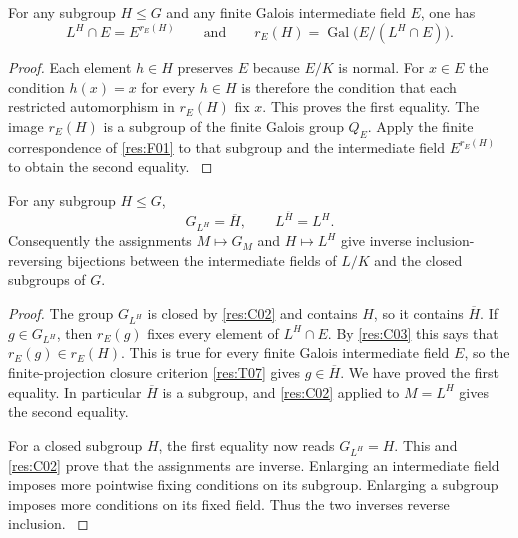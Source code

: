 \begin{lemma}
\label{res:C03}
For any subgroup \(H\leq G\) and any finite Galois intermediate field
\(E\), one has
\[
  L^H\cap E=E^{r_E(H)}
  \qquad\text{and}\qquad
  r_E(H)=\operatorname{Gal}\bigl(E/(L^H\cap E)\bigr).
\]
\end{lemma}

\begin{proof}
Each element \(h\in H\) preserves \(E\) because \(E/K\) is normal.
For \(x\in E\) the condition \(h(x)=x\) for every \(h\in H\)
is therefore the condition that each restricted automorphism in
\(r_E(H)\) fix \(x\). This proves the first equality. The image
\(r_E(H)\) is a subgroup of the finite Galois group \(Q_E\).
Apply the finite correspondence of \ref{res:F01} to that subgroup
and the intermediate field \(E^{r_E(H)}\) to obtain the second equality.
\cite[Tag 0BML]{stacks}
\end{proof}

\begin{theorem}
\label{res:C04}
For any subgroup \(H\leq G\),
\[
    G_{L^H}=\overline H,
    \qquad L^{\overline H}=L^H .
\]
Consequently the assignments \(M\mapsto G_M\) and \(H\mapsto L^H\)
give inverse inclusion-reversing bijections between the intermediate
fields of \(L/K\) and the closed subgroups of \(G\).
\end{theorem}

\begin{proof}
The group \(G_{L^H}\) is closed by \ref{res:C02} and contains \(H\),
so it contains \(\overline H\). If \(g\in G_{L^H}\), then \(r_E(g)\)
fixes every element of \(L^H\cap E\). By \ref{res:C03} this says that
\(r_E(g)\in r_E(H)\). This is true for every finite Galois intermediate
field \(E\), so the finite-projection closure criterion \ref{res:T07}
gives \(g\in\overline H\). We have proved the first equality. In
particular \(\overline H\) is a subgroup, and \ref{res:C02} applied
to \(M=L^H\) gives the second equality.

For a closed subgroup \(H\), the first equality now reads
\(G_{L^H}=H\). This and \ref{res:C02} prove that the assignments
are inverse. Enlarging an intermediate field imposes more pointwise
fixing conditions on its subgroup. Enlarging a subgroup imposes
more conditions on its fixed field. Thus the two inverses reverse
inclusion.
\cite[Proposition 7.12 and Theorem 7.13(a)]{milne}
\cite[Theorem 2.11.3]{rz}
\cite[Tag 0BML]{stacks}
\end{proof}

